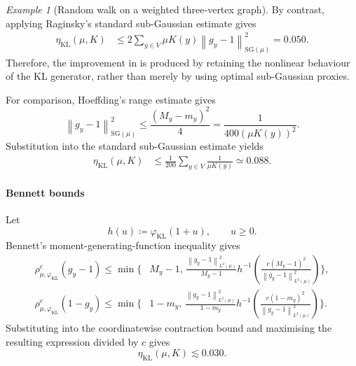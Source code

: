 \documentclass[11pt]{article}
\theoremstyle{plain}
\theoremstyle{remark}
\newtheorem{example}{Example}
\begin{document}
\begin{example}[Random walk on a weighted three-vertex graph]
By contrast, applying Raginsky's standard sub-Gaussian estimate gives
\begin{align}
\eta_{\mathrm{KL}}(\mu,K)
&\leq
2
\sum_{y\in V}
\mu K(y)
\left\lVert g_y-1\right\rVert_{\mathrm{SG}(\mu)}^2=
0.050.
\label{eq:biasedRefreshmentRaginsky}
\end{align}
Therefore, the improvement in
 is produced by retaining
the nonlinear behaviour of the KL generator, rather than merely by
using optimal sub-Gaussian proxies.

For comparison, Hoeffding's range estimate gives
\begin{equation}
\left\lVert g_y-1\right\rVert_{\mathrm{SG}(\mu)}^2
\leq
\frac{(M_y-m_y)^2}{4}
=
\frac{1}{400\left(\mu K(y)\right)^2}.
\end{equation}
Substitution into the standard sub-Gaussian estimate yields
\begin{align}
\eta_{\mathrm{KL}}(\mu,K)
&\leq
\frac{1}{200}
\sum_{y\in V}
\frac{1}{\mu K(y)}
\simeq
0.088.
\label{eq:biasedRefreshmentRangeHoeffding}
\end{align}

\paragraph*{Bennett bounds}
Let
\begin{equation}
h(u)
\coloneqq
\varphi_{\mathrm{KL}}(1+u),
\qquad u\geq0.
\end{equation}
Bennett's moment-generating-function inequality gives
\begin{align}
\rho_{\mu,\varphi_{\mathrm{KL}}}^{c}(g_y-1)
\leq
\min\Bigg\{
&M_y-1,\,
\frac{
\left\lVert g_y-1\right\rVert_{L^2(\mu)}^2
}{
M_y-1
}
h^{-1}\left(
\frac{
c(M_y-1)^2
}{
\left\lVert g_y-1\right\rVert_{L^2(\mu)}^2
}
\right)
\Bigg\},
\label{eq:biasedRefreshmentBennettPositiveGauge}
\\
\rho_{\mu,\varphi_{\mathrm{KL}}}^{c}(1-g_y)
\leq
\min\Bigg\{
&1-m_y,\,
\frac{
\left\lVert g_y-1\right\rVert_{L^2(\mu)}^2
}{
1-m_y
}
h^{-1}\left(
\frac{
c(1-m_y)^2
}{
\left\lVert g_y-1\right\rVert_{L^2(\mu)}^2
}
\right)
\Bigg\}.
\label{eq:biasedRefreshmentBennettNegativeGauge}
\end{align}
Substituting
into the coordinatewise contraction bound and maximising the resulting
expression divided by $c$ gives
\begin{equation}
\eta_{\mathrm{KL}}(\mu,K)
\lesssim 0.030.
\label{eq:biasedRefreshmentNonlinearBennettSDPI}
\end{equation}


\end{example}
\end{document}
